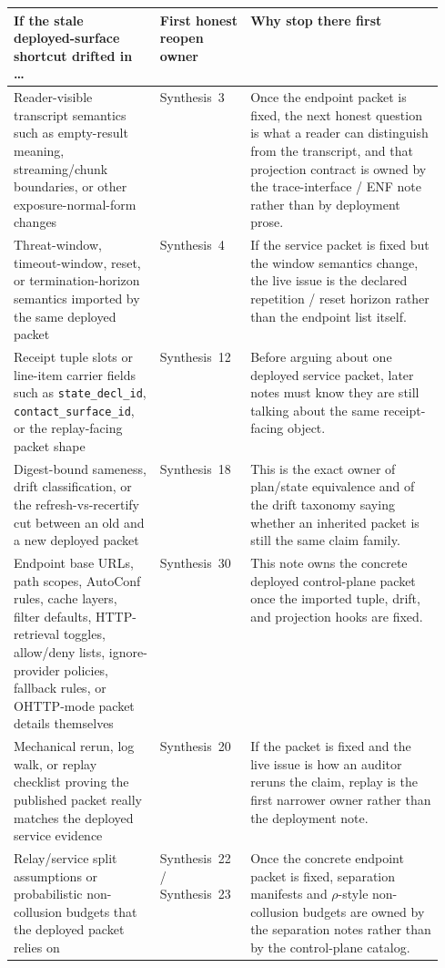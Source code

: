 \documentclass[11pt]{article}
\begin{document}
\begin{table}[t]
\centering
\small
\begin{tabularx}{0.98\linewidth}{@{}p{0.34\linewidth}p{0.21\linewidth}X@{}}
\toprule
\textbf{If the stale deployed-surface shortcut drifted in \dots} & \textbf{First honest reopen owner} & \textbf{Why stop there first}\\
\midrule
Reader-visible transcript semantics such as empty-result meaning, streaming/chunk boundaries, or other exposure-normal-form changes & Synthesis~3 & Once the endpoint packet is fixed, the next honest question is what a reader can distinguish from the transcript, and that projection contract is owned by the trace-interface / ENF note rather than by deployment prose.\\
Threat-window, timeout-window, reset, or termination-horizon semantics imported by the same deployed packet & Synthesis~4 & If the service packet is fixed but the window semantics change, the live issue is the declared repetition / reset horizon rather than the endpoint list itself.\\
Receipt tuple slots or line-item carrier fields such as \texttt{state\_decl\_id}, \texttt{contact\_surface\_id}, or the replay-facing packet shape & Synthesis~12 & Before arguing about one deployed service packet, later notes must know they are still talking about the same receipt-facing object.\\
Digest-bound sameness, drift classification, or the refresh-vs-recertify cut between an old and a new deployed packet & Synthesis~18 & This is the exact owner of plan/state equivalence and of the drift taxonomy saying whether an inherited packet is still the same claim family.\\
Endpoint base URLs, path scopes, AutoConf rules, cache layers, filter defaults, HTTP-retrieval toggles, allow/deny lists, ignore-provider policies, fallback rules, or OHTTP-mode packet details themselves & Synthesis~30 & This note owns the concrete deployed control-plane packet once the imported tuple, drift, and projection hooks are fixed.\\
Mechanical rerun, log walk, or replay checklist proving the published packet really matches the deployed service evidence & Synthesis~20 & If the packet is fixed and the live issue is how an auditor reruns the claim, replay is the first narrower owner rather than the deployment note.\\
Relay/service split assumptions or probabilistic non-collusion budgets that the deployed packet relies on & Synthesis~22 / Synthesis~23 & Once the concrete endpoint packet is fixed, separation manifests and $\rho$-style non-collusion budgets are owned by the separation notes rather than by the control-plane catalog.\\

\end{tabularx}
\end{table}
\end{document}
